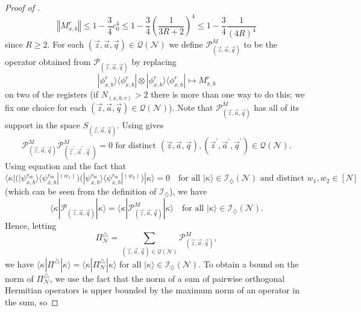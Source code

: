\documentclass[../thesis-main/thesis-main]{subfiles}
\begin{document}
\begin{proof}[Proof of \protect{}]
\begin{equation}
\left\Vert M_{x,b}^{r}\right\Vert \leq1-\frac{3}{4}c_{0}^{4}\leq1-\frac{3}{4}\left(\frac{1}{3R+2}\right)^{4}\leq1-\frac{3}{4}\frac{1}{(4R)^4}
\end{equation}
since $R\geq2$. For each $(\vec{z},\vec{a},\vec{q})\in\mathcal{Q}(\mathcal{N})$ we define $\mathcal{P}_{(\vec{z},\vec{a},\vec{q})}^{M}$ to be the operator obtained from $\mathcal{P}_{(\vec{z},\vec{a},\vec{q})}$ by replacing
\begin{equation}
|\phi_{x,b}^{r}\rangle\langle\phi_{x,b}^{r}|\otimes|\phi_{x,b}^{r}\rangle\langle\phi_{x,b}^{r}|\mapsto M_{x,b}^{r}
\end{equation}
on two of the registers (if $N_{(x,b,r)}>2$ there is more than one way to do this; we fix one choice for each $(\vec{z},\vec{a},\vec{q})\in\mathcal{Q}(\mathcal{N})$). Note that $\mathcal{P}_{(\vec{z},\vec{a},\vec{q})}^{M}$ has all of its support in the space $S_{(\vec{z},\vec{a},\vec{q})}$. Using  gives
\begin{equation}
\mathcal{P}_{(\vec{z},\vec{a},\vec{q})}^{M}\mathcal{P}_{(\vec{z}^{\prime},\vec{a}^{\prime},\vec{q}^{\prime})}^{M}=0\text{ for distinct }(\vec{z},\vec{a},\vec{q}),(\vec{z}^{\prime},\vec{a}^{\prime},\vec{q}^{\prime})\in\mathcal{Q}(\mathcal{N}).
\end{equation}
Using equation  and the fact that
\begin{equation}
\langle\kappa|\Big(|\psi_{x,b}^{r_{\text{in}}}\rangle\langle\psi_{x,b}^{r_{\text{in}}}|^{(w_{1})}\Big)\Big(|\psi_{x,b}^{r_{\text{in}}}\rangle\langle\psi_{x,b}^{r_{\text{in}}}|^{(w_{2})}\Big)|\kappa\rangle=0\quad\text{for all }|\kappa\rangle\in\mathcal{I}_{\diamondsuit}(\mathcal{N})\text{ and distinct }w_{1},w_{2}\in[N]
\end{equation}
(which can be seen from the definition of $\mathcal{I}_\diamondsuit$), we have 
\begin{equation}
\langle\kappa|\mathcal{P}_{(\vec{z},\vec{a},\vec{q})}|\kappa\rangle=\langle\kappa|\mathcal{P}_{(\vec{z},\vec{a},\vec{q})}^{M}|\kappa\rangle\quad\text{for all }|\kappa\rangle\in\mathcal{I}_{\diamondsuit}(\mathcal{N}).
\end{equation}
Hence, letting 
\begin{equation}
\Pi_{\mathcal{N}}^{\triangle}=\sum_{(\vec{z},\vec{a},\vec{q})\in\mathcal{Q}(\mathcal{N})}\mathcal{P}_{(\vec{z},\vec{a},\vec{q})}^{M},\label{eq:pi_triangle_N}
\end{equation}
we have $\langle\kappa|\Pi^{\triangle}|\kappa\rangle=\langle\kappa|\Pi_{\mathcal{N}}^{\triangle}|\kappa\rangle$ for all $|\kappa\rangle\in\mathcal{I}_{\diamondsuit}(\mathcal{N})$. To obtain a bound on the norm of $\Pi_{\mathcal{N}}^{\triangle}$, we use the fact that the norm of a sum of pairwise orthogonal Hermitian operators is upper bounded by the maximum norm of an operator in the sum, so

\end{proof}
\end{document}
